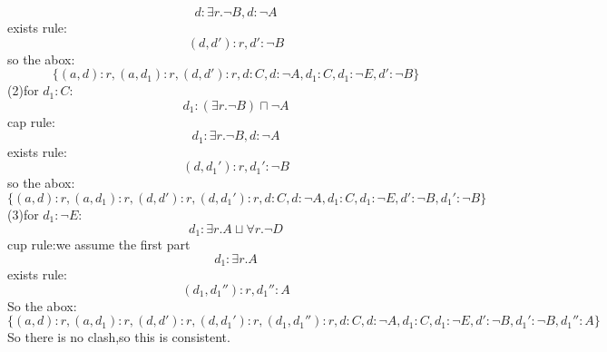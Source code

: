 \documentclass{article}
\begin{document}
    \[
        d:\exists r.\neg B,d:\neg A
    \]
    exists rule:\\
    \[
        (d,d'):r,d':\neg B
    \]
    so the abox:\\
    \[
        \{(a,d):r,(a,d_1):r,(d,d'):r,d:C,d:\neg A,d_1:C,d_1:\neg E,d':\neg B \}  
    \]
    (2)for $d_1:C$:\\
    \[
        d_1:(\exists r.\neg B)\sqcap\neg A
    \]
    cap rule:\\
    \[
        d_1:\exists r.\neg B,d:\neg A
    \] 
    exists rule:\\
    \[
        (d,d_1'):r,d_1':\neg B
    \]
    so the abox:\\
    \[
        \{(a,d):r,(a,d_1):r,(d,d'):r,(d,d_1'):r,d:C,d:\neg A,d_1:C,d_1:\neg E,d':\neg B,d_1':\neg B \}  
    \]
    (3)for $d_1:\neg E$:\\
    \[
        d_1:\exists r.A \sqcup \forall r. \neg D  
    \]
    cup rule:we assume the first part\\
    \[
        d_1 :\exists r.A
    \]
    exists rule:\\
    \[
        (d_1,d_1''):r,d_1'':A
    \]
    So the abox:\\
    \[
        \{(a,d):r,(a,d_1):r,(d,d'):r,(d,d_1'):r,(d_1,d_1''):r,d:C,d:\neg A,d_1:C,d_1:\neg E,d':\neg B,d_1':\neg B,d_1'':A \}  
    \]
    So there is no clash,so this is consistent.\\
\end{document}
